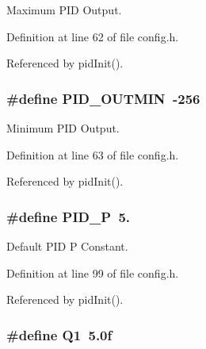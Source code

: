 Maximum P\-I\-D Output. 



Definition at line 62 of file config.\-h.



Referenced by pid\-Init().

\hypertarget{group__config_ga684067981e82e4827607d0b0558812cb}{
\subsubsection[{P\-I\-D\-\_\-\-O\-U\-T\-M\-I\-N}]{\setlength{\rightskip}{0pt plus 5cm}\#define P\-I\-D\-\_\-\-O\-U\-T\-M\-I\-N~-\/256}}\label{group__config_ga684067981e82e4827607d0b0558812cb}


Minimum P\-I\-D Output. 



Definition at line 63 of file config.\-h.



Referenced by pid\-Init().

\hypertarget{group__config_gab3ea7c9a4399d8844727806c960880ad}{
\subsubsection[{P\-I\-D\-\_\-\-P}]{\setlength{\rightskip}{0pt plus 5cm}\#define P\-I\-D\-\_\-\-P~5.}}\label{group__config_gab3ea7c9a4399d8844727806c960880ad}


Default P\-I\-D P Constant. 



Definition at line 99 of file config.\-h.



Referenced by pid\-Init().

\hypertarget{group__config_ga0f32727853a3ac3d848701803c3b8688}{
\subsubsection[{Q1}]{\setlength{\rightskip}{0pt plus 5cm}\#define Q1~5.\-0f}}\label{group__config_ga0f32727853a3ac3d848701803c3b8688}


